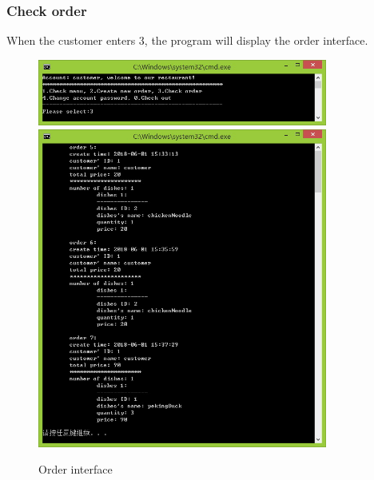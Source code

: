 \documentclass{article}
\begin{document}
\subsubsection{Check order}
When the customer enters 3, the program will display the order interface.
\begin{figure}[H]
    \centering
    \includegraphics[width=0.85\textwidth]{P/P3a.jpg}
    \includegraphics[width=0.85\textwidth]{P/P3b.jpg}
    \caption{Order interface}
\end{figure}
\end{document}
